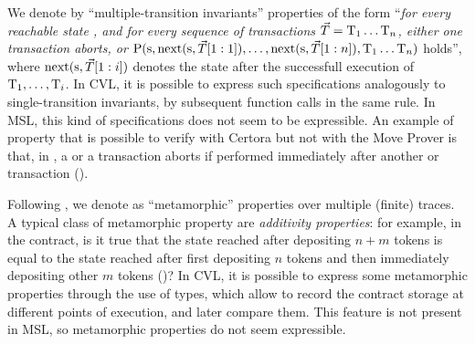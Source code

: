 We denote by ``multiple-transition invariants'' properties of the form 
``\emph{for every reachable state \state, and for every sequence of transactions $\vec{T} = \method_1 \ldots \method_n$, either one transaction aborts, or 
$\Prop(\state, \nexts(\state,\vec{T}[1:1]), \dots , \nexts(\state,\vec{T}[1:n]), \method_1 \ldots \method_n)$} holds'', 
where $\nexts(\state,\vec{T}[1:i])$ 
denotes the  state after the successfull execution of $\method_1, \dots, \method_i$.
In CVL, it is possible to express such specifications analogously to single-transition invariants, by subsequent function calls in the same rule. 
In MSL, this kind of specifications does not seem to be expressible. 
An example of property that is possible to verify with Certora but not with the Move Prover is that, in , 
a  or a  transaction aborts if performed immediately after another  or  transaction
().


Following \cite{Chen18csur}, we denote as ``{metamorphic}'' properties over multiple (finite) traces.
A typical class of metamorphic property are \emph{additivity properties}: for example, in the  contract, is it true that the state reached after depositing $n+m$ tokens is equal to the state reached after first depositing $n$ tokens and then immediately depositing other $m$ tokens ()?  
In CVL, it is possible to express some metamorphic properties  through the use of  types, 
which allow to record the contract storage at different points of execution, and later compare them. %
This feature is not present in MSL, so metamorphic properties do not seem expressible.
    
